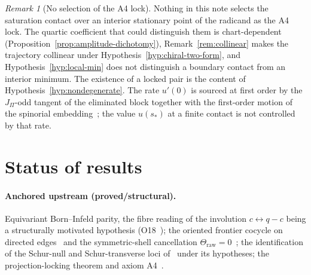 \documentclass[11pt]{article}
\theoremstyle{definition}
\theoremstyle{remark}
\newtheorem{remark}{Remark}
\newcommand{\JPi}{J_{\Pi}}
\begin{document}
    \begin{remark}[No selection of the A4 lock]
      \label{cor:boundary-admissible}
      Nothing in this note selects the saturation contact over an interior stationary point of the radicand as the A4
      lock.
      The quartic coefficient that could distinguish them is chart-dependent
      (Proposition~\ref{prop:amplitude-dichotomy}),
      Remark~\ref{rem:collinear} makes the trajectory collinear under Hypothesis~\ref{hyp:chiral-two-form}, and
      Hypothesis~\ref{hyp:local-min} does not distinguish a boundary
      contact from an interior minimum.
      The existence of a locked pair is the content of Hypothesis~\ref{hyp:nondegenerate}.
      The rate $u'(0)$ is sourced at first order by the $\JPi$-odd tangent of the eliminated block together with the
      first-order motion of the spinorial embedding~\cite{Beau2026ebj}; the value $u(s_*)$ at a finite contact is not
      controlled by that rate.
    \end{remark}

  \section{Status of results}
    \label{sec:status}

    \paragraph{Anchored upstream (proved/structural).}
      Equivariant Born--Infeld parity, the fibre reading of the involution $c \leftrightarrow q-c$ being a structurally
      motivated
      hypothesis (O18~\cite{Beau2026a22}); the oriented frontier cocycle on
      directed edges~\cite{Beau2026q11of} and the
      symmetric-shell cancellation $\Theta_{\mathrm{raw}} = 0$~\cite{Beau2026aar}; the identification of the
      Schur-null and Schur-transverse loci of~\cite{Beau2026prs} under its hypotheses; the projection-locking theorem
      and axiom A4~\cite{Beau2026a26, Beau2026m}.
\end{document}
